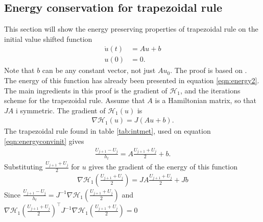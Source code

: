 \subsection{Energy conservation for trapezoidal rule} %
This section will show the energy preserving properties of trapezoidal rule on the initial value shifted function
\begin{equation}
\begin{aligned}
\dot{u}(t)& = Au + b \\
u(0)& = 0.
\end{aligned}
\label{eqn:energyconvinit}
\end{equation}
Note that $b$ can be any constant vector, not just $A u_0$. The proof is based on \cite{convtrap}.
The energy of this function has already been presented in equation \eqref{eqn:energy2}. The main ingredients in this proof is the gradient of $\mathcal{H}_1$, and the iterations scheme for the trapezoidal rule. Assume that $A$ is a Hamiltonian matrix, so that $JA$ i symmetric. The gradient of $\mathcal{H}_1(u)$ is 
\begin{equation*}
\begin{aligned}
\nabla \mathcal{H}_1(u) = J (Au + b) .
\end{aligned}
\end{equation*}
The trapezoidal rule found in table \ref{tab:intmet}, used on equation \eqref{eqn:energyconvinit} gives 
\begin{equation*}
\begin{aligned}
\frac{U_{j+1} - U_j}{h_t} = A \frac{U_{j+1}  + U_j}{2} + b.
\end{aligned}
\end{equation*}
Substituting $\frac{U_{j+1}  + U_j}{2} $ for $u$ gives the gradient of the energy of this function
\begin{equation*}
\begin{aligned}
\nabla \mathcal{H}_1(\frac{U_{j+1}  + U_j}{2}) = JA \frac{U_{j+1}  + U_j}{2} + J b
\end{aligned}
\end{equation*}
Since
$\frac{ U_{j+1} - U_j}{h_t} = J^{-1} \nabla \mathcal{H}_1( \frac{U_{j+1}  + U_j}{2} ) $
and
$\nabla \mathcal{H}_1(\frac{U_{j+1}  + U_j}{2})^\top J^{-1} \nabla \mathcal{H}_1(\frac{U_{j+1}  + U_j}{2}) = 0$
